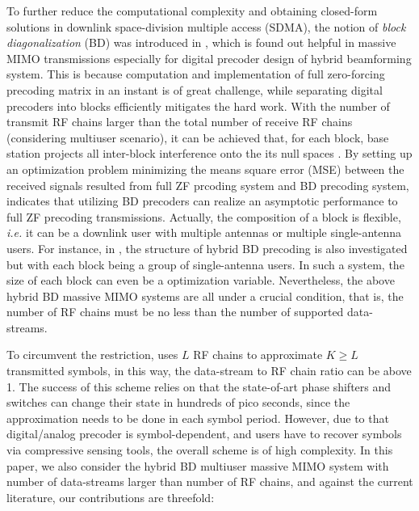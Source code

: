 \documentclass[conference]{IEEEtran}
\begin{document}
To further reduce the computational complexity and obtaining closed-form solutions in downlink space-division multiple access (SDMA), the notion of \textit{block diagonalization} (BD) was introduced in \cite{spencer2004zero}, which is found out helpful in massive MIMO transmissions especially for digital precoder design of hybrid beamforming system. This is because computation and implementation of full zero-forcing precoding matrix in an instant is of great challenge, while separating digital precoders into blocks efficiently mitigates the hard work. With the number of transmit RF chains larger than the total number of receive RF chains (considering multiuser scenario), it can be achieved that, for each block, base station projects all inter-block interference onto the its null spaces \cite{ni2016hybrid}. By setting up an optimization problem minimizing the means square error (MSE) between the received signals resulted from full ZF prcoding system and BD precoding system, \cite{bogale2014beamforming} indicates that utilizing BD precoders can realize an asymptotic performance to full ZF precoding transmissions. Actually, the composition of a block is flexible, \textit{i.e.} it can be a downlink user with multiple antennas or multiple single-antenna users. For instance, in \cite{liu2014phase}, the structure of hybrid BD precoding is also investigated but with each block being a group of single-antenna users. In such a system, the size of each block can even be a optimization variable. Nevertheless, the above hybrid BD massive MIMO systems are all under a crucial condition, that is, the number of RF chains must be no less than the number of supported data-streams.

To circumvent the restriction, \cite{garcia2017mimo} uses $L$ RF chains to approximate $K\geq L$ transmitted symbols, in this way, the data-stream to RF chain ratio can be above 1. The success of this scheme relies on that the state-of-art phase shifters and switches can change their state in hundreds of pico seconds, since the approximation needs to be done in each symbol period. However, due to that digital/analog precoder is symbol-dependent, and users have to recover symbols via compressive sensing tools, the overall scheme is of high complexity. In this paper, we also consider the hybrid BD multiuser massive MIMO system with number of data-streams larger than number of RF chains, and against the current literature, our contributions are threefold:
\end{document}
